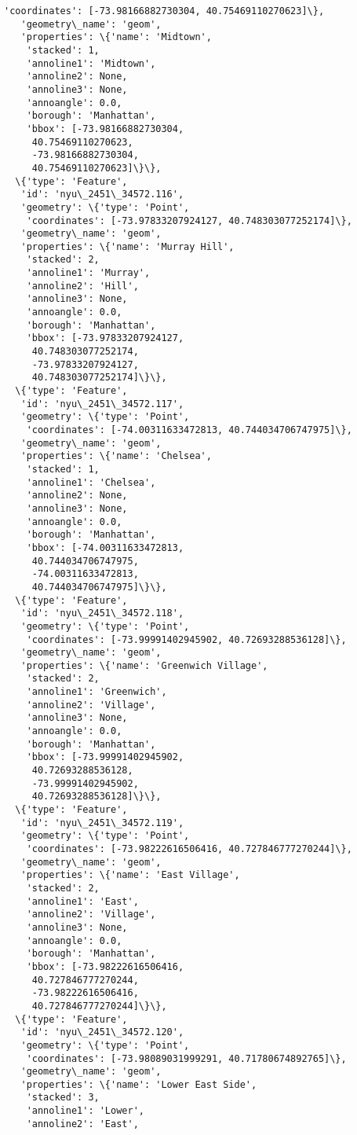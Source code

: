 \documentclass[11pt]{article}
\begin{document}
\begin{tcolorbox}[breakable, size=fbox, boxrule=.5pt, pad at break*=1mm, opacityfill=0]
\begin{Verbatim}[commandchars=\\\{\}]
    'coordinates': [-73.98166882730304, 40.75469110270623]\},
   'geometry\_name': 'geom',
   'properties': \{'name': 'Midtown',
    'stacked': 1,
    'annoline1': 'Midtown',
    'annoline2': None,
    'annoline3': None,
    'annoangle': 0.0,
    'borough': 'Manhattan',
    'bbox': [-73.98166882730304,
     40.75469110270623,
     -73.98166882730304,
     40.75469110270623]\}\},
  \{'type': 'Feature',
   'id': 'nyu\_2451\_34572.116',
   'geometry': \{'type': 'Point',
    'coordinates': [-73.97833207924127, 40.748303077252174]\},
   'geometry\_name': 'geom',
   'properties': \{'name': 'Murray Hill',
    'stacked': 2,
    'annoline1': 'Murray',
    'annoline2': 'Hill',
    'annoline3': None,
    'annoangle': 0.0,
    'borough': 'Manhattan',
    'bbox': [-73.97833207924127,
     40.748303077252174,
     -73.97833207924127,
     40.748303077252174]\}\},
  \{'type': 'Feature',
   'id': 'nyu\_2451\_34572.117',
   'geometry': \{'type': 'Point',
    'coordinates': [-74.00311633472813, 40.744034706747975]\},
   'geometry\_name': 'geom',
   'properties': \{'name': 'Chelsea',
    'stacked': 1,
    'annoline1': 'Chelsea',
    'annoline2': None,
    'annoline3': None,
    'annoangle': 0.0,
    'borough': 'Manhattan',
    'bbox': [-74.00311633472813,
     40.744034706747975,
     -74.00311633472813,
     40.744034706747975]\}\},
  \{'type': 'Feature',
   'id': 'nyu\_2451\_34572.118',
   'geometry': \{'type': 'Point',
    'coordinates': [-73.99991402945902, 40.72693288536128]\},
   'geometry\_name': 'geom',
   'properties': \{'name': 'Greenwich Village',
    'stacked': 2,
    'annoline1': 'Greenwich',
    'annoline2': 'Village',
    'annoline3': None,
    'annoangle': 0.0,
    'borough': 'Manhattan',
    'bbox': [-73.99991402945902,
     40.72693288536128,
     -73.99991402945902,
     40.72693288536128]\}\},
  \{'type': 'Feature',
   'id': 'nyu\_2451\_34572.119',
   'geometry': \{'type': 'Point',
    'coordinates': [-73.98222616506416, 40.727846777270244]\},
   'geometry\_name': 'geom',
   'properties': \{'name': 'East Village',
    'stacked': 2,
    'annoline1': 'East',
    'annoline2': 'Village',
    'annoline3': None,
    'annoangle': 0.0,
    'borough': 'Manhattan',
    'bbox': [-73.98222616506416,
     40.727846777270244,
     -73.98222616506416,
     40.727846777270244]\}\},
  \{'type': 'Feature',
   'id': 'nyu\_2451\_34572.120',
   'geometry': \{'type': 'Point',
    'coordinates': [-73.98089031999291, 40.71780674892765]\},
   'geometry\_name': 'geom',
   'properties': \{'name': 'Lower East Side',
    'stacked': 3,
    'annoline1': 'Lower',
    'annoline2': 'East',

\end{Verbatim}
\end{tcolorbox}
\end{document}
